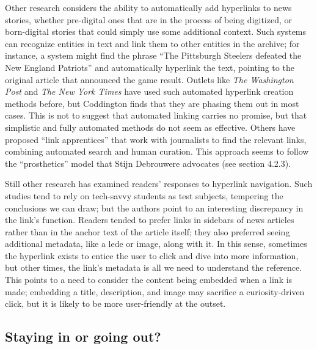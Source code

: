 Other research considers the ability to automatically add hyperlinks to news stories, whether pre-digital ones that are in the process of being digitized, or born-digital stories that could simply use some additional context.\autocite{arapakis_automatically_2014} Such systems can recognize entities in text and link them to other entities in the archive; for instance, a system might find the phrase ``The Pittsburgh Steelers defeated the New England Patriots'' and automatically hyperlink the text, pointing to the original article that announced the game result. Outlets like \emph{The Washington Post} and \emph{The New York Times} have used such automated hyperlink creation methods before, but Coddington finds that they are phasing them out in most cases.\autocite[148]{coddington_normalizing_2014} This is not to suggest that automated linking carries no promise, but that simplistic and fully automated methods do not seem as effective. Others have proposed ``link apprentices'' that work with journalists to find the relevant links, combining automated search and human curation.\autocite{bernstein_apprentice_1990} This approach seems to follow the ``prosthetics'' model that Stijn Debrouwere advocates (see section 4.2.3).

Still other research has examined readers' responses to hyperlink navigation. Such studies tend to rely on tech-savvy students as test subjects, tempering the conclusions we can draw; but the authors point to an interesting discrepancy in the link's function. Readers tended to prefer links in sidebars of news articles rather than in the anchor text of the article itself; they also preferred seeing additional metadata, like a lede or image, along with it.\autocites[See][]{eveland_user_2001}{tremayne_manipulating_2008} In this sense, sometimes the hyperlink exists to entice the user to click and dive into more information, but other times, the link's metadata is all we need to understand the reference. This points to a need to consider the content being embedded when a link is made; embedding a title, description, and image may sacrifice a curiosity-driven click, but it is likely to be more user-friendly at the outset.

\subsection{Staying in or going out?}

